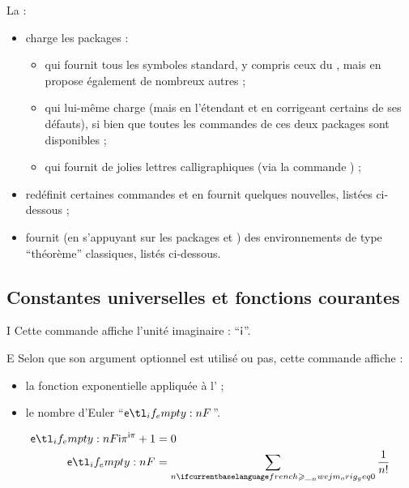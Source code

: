 \documentclass[french,nolocaltoc]{nwejmart}
\newtheorem[title=Fait,style=definition]{fact}
\begin{document}
La \nwejmauthorcl{} :
\begin{itemize}
\item charge les packages :
  \begin{itemize}
  \item {} qui fournit tous les symboles standard, y compris
    ceux du , mais en propose également de nombreux autres ;
  \item {} qui lui-même charge  (mais en
    l'étendant et en corrigeant certains de ses défauts), si bien que toutes les
    commandes de ces deux packages sont disponibles ;
  \item {} qui fournit de jolies lettres calligraphiques (via
    la commande ) ;
  \end{itemize}
\item redéfinit certaines commandes et en fournit quelques nouvelles, listées
  ci-dessous ;
\item fournit (en s'appuyant sur les packages  et
  ) des environnements de type \enquote{théorème} classiques,
  listés ci-dessous.
\end{itemize}

\subsection{Constantes universelles et fonctions courantes}

\begin{docCommand}{I}{}
  Cette commande affiche l'unité imaginaire : \enquote{$\mathsf{i}$}.
\end{docCommand}

\begin{docCommand}{E}{}
 Selon que son argument optionnel est utilisé ou pas, cette commande affiche :
  \begin{itemize}
  \item la fonction exponentielle appliquée à l' ;
  \item le nombre d'Euler \enquote{$\E$}.
  \end{itemize}
\end{docCommand}

\begin{bodycode}
\begin{align}
  \E[\I\pi]+1 & = 0 \\
  \E          & = \sum_{n\geq 0} \frac{1}{n!}
\end{align}
\end{bodycode}
\end{document}
